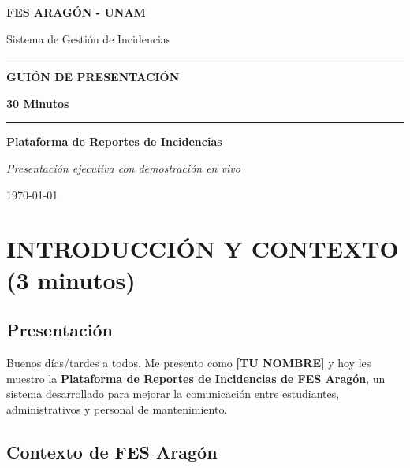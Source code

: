 \documentclass[12pt, a4paper, spanish]{article}
\begin{document}
\begin{titlepage}
    \begin{center}
        \vspace*{1.5cm}
        
        \LARGE\textbf{\textcolor{azulUNAM}{FES ARAGÓN - UNAM}}
        
        \vspace{0.5cm}
        \normalsize\textcolor{gris}{Sistema de Gestión de Incidencias}
        
        \vspace{2cm}
        \rule{\linewidth}{2pt}
        \vspace{1cm}
        
        \Huge\textbf{\textcolor{azulUNAM}{GUIÓN DE PRESENTACIÓN}}
        
        \LARGE\textbf{\textcolor{naranjaUNAM}{30 Minutos}}
        
        \vspace{1cm}
        \rule{\linewidth}{2pt}
        
        \vspace{2cm}
        \Large\textbf{Plataforma de Reportes de Incidencias}
        
        \vspace{3cm}
        \textcolor{gris}{\textit{Presentación ejecutiva con demostración en vivo}}
        
        \vfill
        \textcolor{gris}{\today}
    \end{center}
\end{titlepage}

\tableofcontents
\newpage

\section{INTRODUCCIÓN Y CONTEXTO (3 minutos)}

\subsection{Presentación}

Buenos días/tardes a todos. Me presento como \textbf{[TU NOMBRE]} y hoy les muestro la \textbf{Plataforma de Reportes de Incidencias de FES Aragón}, un sistema desarrollado para mejorar la comunicación entre estudiantes, administrativos y personal de mantenimiento.

\subsection{Contexto de FES Aragón}
\end{document}
